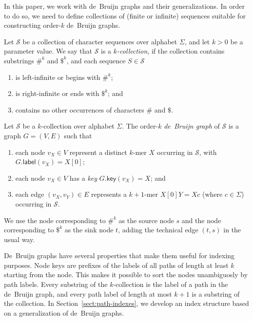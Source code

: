 \documentclass[a4paper,UKenglish]{lipics-v2016}
\newcommand{\glabel}{\ensuremath{\mathsf{label}}}
\newcommand{\gkey}{\ensuremath{\mathsf{key}}}
\newcommand{\kmer}[1]{$#1$\nobreakdash-mer}
\newcommand{\kcollection}[1]{$#1$\nobreakdash-collection}
\newcommand{\orderk}[1]{order\nobreakdash-$#1$}
\begin{document}
In this paper, we work with de~Bruijn graphs and their generalizations. In order to do so, we need to define collections of (finite or infinite) sequences suitable for constructing \orderk{k} de~Bruijn graphs.

\begin{definition}[\kcollection{k}]
Let $\mathcal{S}$ be a collection of character sequences over alphabet $\Sigma$, and let $k > 0$ be a parameter value. We say that $\mathcal{S}$ is a \emph{\kcollection{k}}, if the collection contains substrings $\#^{k}$ and $\$^{k}$, and each sequence $S \in \mathcal{S}$
\begin{enumerate}
\item is left-infinite or begins with $\#^{k}$;
\item is right-infinite or ends with $\$^{k}$; and
\item contains no other occurrences of characters $\#$ and $\$$.
\end{enumerate}
\end{definition}

\begin{definition}
Let $\mathcal{S}$ be a \kcollection{k} over alphabet $\Sigma$. The \orderk{k} \emph{de~Bruijn graph} of $\mathcal{S}$ is a graph $G = (V, E)$ such that
\begin{enumerate}
\item each node $v_{X} \in V$ represent a distinct \kmer{k} $X$ occurring in $\mathcal{S}$, with $G.\glabel(v_{X}) = X[0]$;
\item each node $v_{X} \in V$ has a \emph{key} $G.\gkey(v_{X}) = X$; and
\item each edge $(v_{X}, v_{Y}) \in E$ represents a \kmer{k+1} $X[0]Y = Xc$ (where $c \in \Sigma$) occurring in $\mathcal{S}$.
\end{enumerate}
We use the node corresponding to $\#^{k}$ as the source node $s$ and the node corresponding to $\$^{k}$ as the sink node $t$, adding the technical edge $(t, s)$ in the usual way.
\end{definition}

De~Bruijn graphs have several properties that make them useful for indexing purposes. Node keys are prefixes of the labels of all paths of length at least $k$ starting from the node. This makes it possible to sort the nodes unambiguosly by path labels. Every substring of the \kcollection{k} is the label of a path in the de~Bruijn graph, and every path label of length at most $k+1$ is a substring of the collection. In Section~\ref{sect:path-indexes}, we develop an index structure based on a generalization of de~Bruijn graphs.
\end{document}
